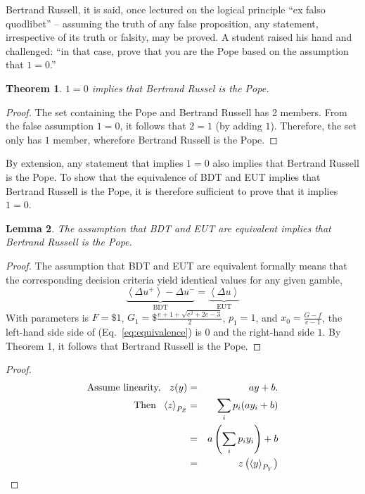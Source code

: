 \documentclass[final]{ectaart}
\newcommand{\ave}[1]{\left\langle#1 \right\rangle}
\newcommand{\elabel}[1]{\label{eq:#1}}
\newcommand{\eref}[1]{(Eq.~\ref{eq:#1})}
\newcommand{\be}{\begin{equation}}
\newcommand{\ee}{\end{equation}}
\newcommand{\bea}{\begin{eqnarray}}
\newcommand{\eea}{\end{eqnarray}}
\newcommand{\Du}{\Delta u}
\theoremstyle{plain}
\newtheorem{thm}{Theorem}[section]
\newtheorem{lem}[thm]{Lemma}
\begin{document}
Bertrand Russell, it is said, once lectured on the logical principle ``ex falso quodlibet'' -- assuming the truth of any false proposition, any statement, irrespective of its truth or falsity, may be proved. A student raised his hand and challenged: ``in that case, prove that you are the Pope based on the assumption that $1=0$.'' 

\begin{thm}
$1=0$ implies that Bertrand Russel is the Pope.
\end{thm}
\begin{proof}
The set containing the Pope and Bertrand Russell has 2 members. From the false assumption $1=0$, it follows that $2=1$ (by adding $1$). Therefore, the set only has $1$ member, wherefore Bertrand Russell is the Pope.
\end{proof}

By extension, any statement that implies $1=0$ also implies that Bertrand Russell is the Pope. To show that the equivalence of BDT \citep{Bernoulli1738} and EUT \citep{vonNeumannMorgenstern1944} implies that Bertrand Russell is the Pope, it is therefore sufficient to prove that it implies $1=0.$

\begin{lem}
The assumption that BDT and EUT are equivalent implies that Bertrand Russell is the Pope.
\end{lem}
\begin{proof}
The assumption that BDT and EUT are equivalent formally means that the corresponding decision criteria yield identical values for any given gamble,
\be
\underbrace{\ave{\Du^+}-\Du^-}_{\text{BDT}}=\underbrace{\ave{\Du}}_{\text{EUT}}
\elabel{equivalence}
\ee
With parameters is $F=\$1$, $G_1=\$\frac{e+1+\sqrt{e^2+2e-3}}{2}$,  $p_1=1$, and $x_0=\frac{G-f}{e-1}$, the left-hand side side of \eref{equivalence} is $0$ and the right-hand side $1$. By Theorem 1, it follows that Bertrand Russell is the Pope.
\end{proof}

\begin{proof}
\bea
\text{Assume linearity, \hspace{.2cm}} z(y)&=&a y +b. \elabel{condition}\\
\text{Then \hspace{.1cm}}\ave{z}_{P_Z}&=& \sum_{i}p_i (a y_i + b)\\
&=&a \left(\sum_{i}p_i  y_i\right) + b\\
&=& z\left(\ave{y}_{P_Y}\right)
\eea
\end{proof}
\end{document}
